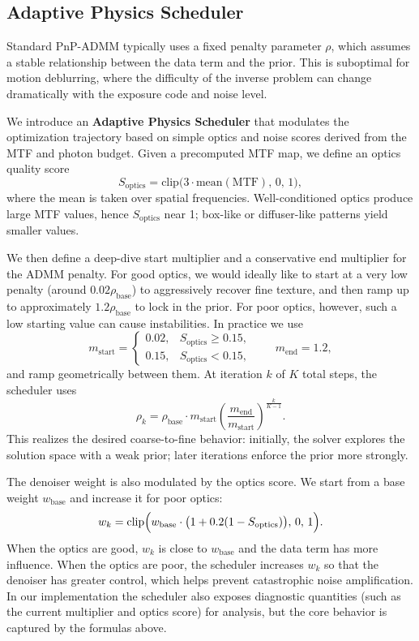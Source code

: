 \documentclass[10pt,journal,compsoc]{IEEEtran}
\begin{document}
\subsection{Adaptive Physics Scheduler}
Standard PnP-ADMM typically uses a fixed penalty parameter $\rho$, which assumes a stable relationship between the data term and the prior. This is suboptimal for motion deblurring, where the difficulty of the inverse problem can change dramatically with the exposure code and noise level.

We introduce an \textbf{Adaptive Physics Scheduler} that modulates the optimization trajectory based on simple optics and noise scores derived from the MTF and photon budget. Given a precomputed MTF map, we define an optics quality score
\begin{equation}
S_{\text{optics}} = \text{clip}\bigl(3 \cdot \text{mean}(\text{MTF}),\, 0,\, 1\bigr),
\end{equation}
where the mean is taken over spatial frequencies. Well-conditioned optics produce large MTF values, hence $S_{\text{optics}}$ near 1; box-like or diffuser-like patterns yield smaller values.

We then define a deep-dive start multiplier and a conservative end multiplier for the ADMM penalty. For good optics, we would ideally like to start at a very low penalty (around $0.02 \rho_{\text{base}}$) to aggressively recover fine texture, and then ramp up to approximately $1.2 \rho_{\text{base}}$ to lock in the prior. For poor optics, however, such a low starting value can cause instabilities. In practice we use
\begin{equation}
m_{\text{start}} =
\begin{cases}
0.02, & S_{\text{optics}} \ge 0.15, \\
0.15, & S_{\text{optics}} < 0.15,
\end{cases}
\qquad
m_{\text{end}} = 1.2,
\end{equation}
and ramp geometrically between them. At iteration $k$ of $K$ total steps, the scheduler uses
\begin{equation}
\rho_k = \rho_{\text{base}} \cdot m_{\text{start}}
\left( \frac{m_{\text{end}}}{m_{\text{start}}} \right)^{\frac{k}{K-1}}.
\end{equation}
This realizes the desired coarse-to-fine behavior: initially, the solver explores the solution space with a weak prior; later iterations enforce the prior more strongly.

The denoiser weight is also modulated by the optics score. We start from a base weight $w_{\text{base}}$ and increase it for poor optics:
\begin{equation}
w_k = \text{clip}\Bigl(w_{\text{base}} \cdot \bigl(1 + 0.2(1 - S_{\text{optics}})\bigr),\, 0,\, 1\Bigr).
\end{equation}
When the optics are good, $w_k$ is close to $w_{\text{base}}$ and the data term has more influence. When the optics are poor, the scheduler increases $w_k$ so that the denoiser has greater control, which helps prevent catastrophic noise amplification. In our implementation the scheduler also exposes diagnostic quantities (such as the current multiplier and optics score) for analysis, but the core behavior is captured by the formulas above.
\end{document}
